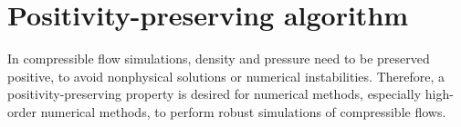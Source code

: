 
\section{Positivity-preserving algorithm}
\label{sec:PP}

In compressible flow simulations, density and pressure need to be preserved positive, to avoid nonphysical solutions or numerical instabilities. Therefore, a positivity-preserving property is desired for numerical methods, especially high-order numerical methods, to perform robust simulations of compressible flows.

